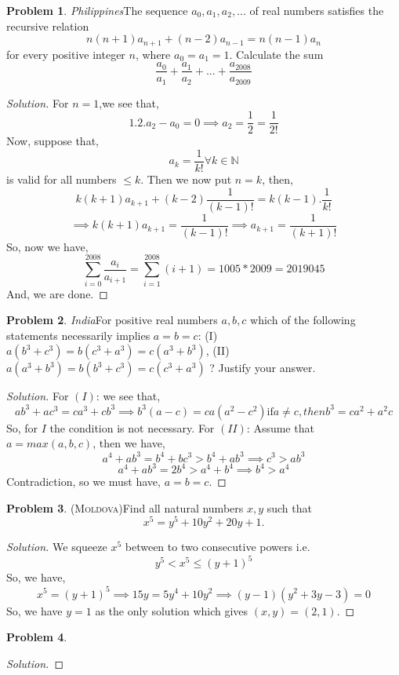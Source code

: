 \documentclass[a4paper,oneside,12 pt]{book}
\theoremstyle{definition}
\theoremstyle{definition}
\newtheorem{prbm}{Problem}[section]
\theoremstyle{definition}
\begin{document}
\begin{prbm}
\textit{Philippines}The sequence ${a_0, a_1, a_2, ...}$ of real numbers satisfies the recursive relation $$n(n+1)a_{n+1}+(n-2)a_{n-1} = n(n-1)a_n$$for every positive integer $n$, where $a_0 = a_1 = 1$. Calculate the sum $$\frac{a_0}{a_1} + \frac{a_1}{a_2} + ... + \frac{a_{2008}}{a_{2009}}$$
\begin{proof}[Solution]
For $n=1$,we see that,
$$1.2.a_2-a_0=0 \implies a_2=\frac{1}{2}=\frac{1}{2!}$$Now, suppose that,
$$a_k=\frac{1}{k!} \forall k \in \mathbb{N}$$is valid for all numbers $\leq k$.
Then we now put $n=k$, then,
$$k(k+1)a_{k+1}+(k-2)\frac{1}{(k-1)!}=k(k-1).\frac{1}{k!}$$
$$\implies k(k+1)a_{k+1}=\frac{1}{(k-1)!} \implies a_{k+1}=\frac{1}{(k+1)!}$$
So, now we have,
$$\sum_{i=0}^{2008} \frac{a_i}{a_{i+1}}=\sum_{i=1}^{2008} (i+1) =1005*2009=2019045$$
And, we are done. 
\end{proof}

\end{prbm}

\begin{prbm}
\textit{India}For positive real numbers $a,b,c$ which of the following statements necessarily implies $a=b=c$: (I) $a(b^3+c^3)=b(c^3+a^3)=c(a^3+b^3)$, (II) $a(a^3+b^3)=b(b^3+c^3)=c(c^3+a^3)$ ? Justify your answer.
\begin{proof}[Solution]
For $(I)$:
we see that,
$$ab^3+ac^3=ca^3+cb^3 \implies b^3(a-c)=ca(a^2-c^2) \text{if} a\not =c, then b^3=ca^2+a^2c$$
So, for $I$ the condition is not necessary.
For $(II)$:
Assume that $a=max(a,b,c)$, then we have,
$$a^4+ab^3=b^4+bc^3>b^4+ab^3 \implies c^3>ab^3$$
$$a^4+ab^3=2b^4>a^4+b^4 \implies b^4>a^4$$
Contradiction, so we must have, $a=b=c$.
\end{proof}

\end{prbm}


\begin{prbm}
\textsc{(Moldova)}Find all natural numbers $x,y$ such that $$x^5=y^5+10y^2+20y+1.$$
\begin{proof}[Solution]
We squeeze $x^5$ between to two consecutive powers i.e.
$$y^5<x^5 \leq (y+1)^5$$So, we have,
$$x^5=(y+1)^5 \implies 15y=5y^4+10y^2 \implies (y-1)(y^2+3y-3)=0$$So, we have $y=1$ as the only solution which gives $\boxed{(x,y)=(2,1)}$.
\end{proof}
\end{prbm}

\begin{prbm}
\begin{proof}[Solution]

\end{proof}
\end{prbm}
\end{document}
